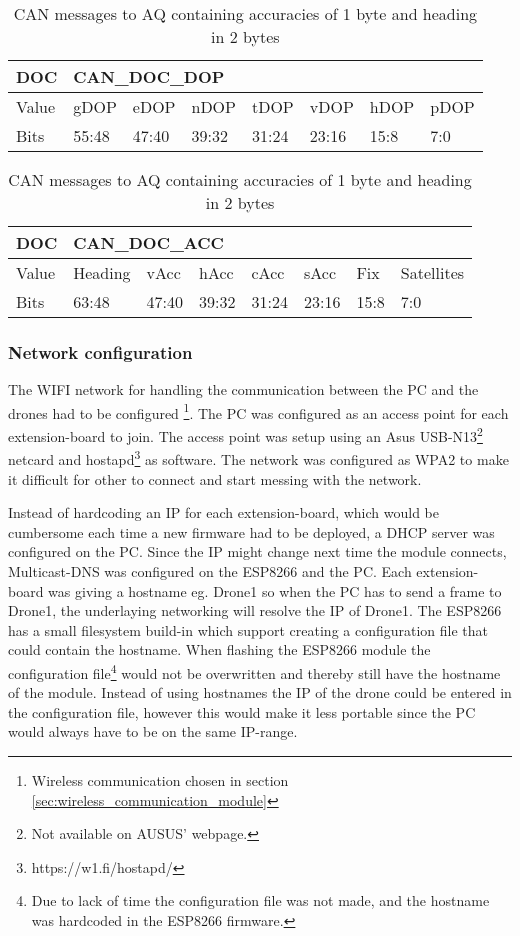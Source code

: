 \begin{table}[H]
	\begin{tabular}{@{}|l|l|l|l|l|l|l|l|@{}}
		\toprule
		DOC   & \multicolumn{7}{l|}{CAN\_DOC\_DOP}                  \\ \midrule
		Value & gDOP  & eDOP  & nDOP  & tDOP  & vDOP  & hDOP & pDOP \\ \midrule
		Bits  & 55:48 & 47:40 & 39:32 & 31:24 & 23:16 & 15:8 & 7:0  \\ \bottomrule
	\end{tabular}
	\caption{CAN messages to \ac{AQ} containing \ac{DOP}s each of 1 byte}
	\label{tab:CAN_DOC_DOP}
	\begin{tabular}{@{}|l|l|l|l|l|l|l|l|@{}}
		\toprule
		DOC   & \multicolumn{7}{l|}{CAN\_DOC\_ACC}                          \\ \midrule
		Value & Heading & vAcc  & hAcc  & cAcc  & sAcc  & Fix  & Satellites \\ \midrule
		Bits  & 63:48   & 47:40 & 39:32 & 31:24 & 23:16 & 15:8 & 7:0        \\ \bottomrule
	\end{tabular}\label{tab:CAN_DOC_ACC}
	\caption{CAN messages to \ac{AQ} containing accuracies of 1 byte and heading in 2 bytes} 
\end{table}

\subsubsection*{Network configuration}  \label{sec:network_configuration}
The WIFI  network for handling the communication between the PC and the drones had to be configured \footnote{Wireless communication chosen in  section \ref{sec:wireless_communication_module}}.
The PC was configured as an access point for each extension-board to join. The access point was setup using an Asus USB-N13\footnote{Not available on AUSUS' webpage.} netcard and hostapd\footnote{https://w1.fi/hostapd/} as software. The network was configured as \ac{WPA2} to make it difficult for other to connect and start messing with the network.

Instead of hardcoding an  \ac{IP} for each extension-board, which would be cumbersome each time a new firmware had to be deployed, a \ac{DHCP} server was configured on the PC. Since the IP might change next time the module connects, Multicast-DNS was configured on the ESP8266 and the PC. Each extension-board was giving a hostname eg. Drone1 so when the PC has to send a frame to Drone1, the underlaying networking will resolve the IP of Drone1.
The ESP8266 has a small filesystem build-in which support creating a configuration file that could contain the hostname.
When flashing the ESP8266 module the configuration file\footnote{Due to lack of time the configuration file was not made, and the hostname was hardcoded in the ESP8266 firmware.} would not be overwritten and thereby still have the hostname of the module. Instead of using hostnames the \ac{IP} of the drone could be entered in the configuration file, however this would make it less portable since the PC would always have to be on the same \ac{IP}-range.


